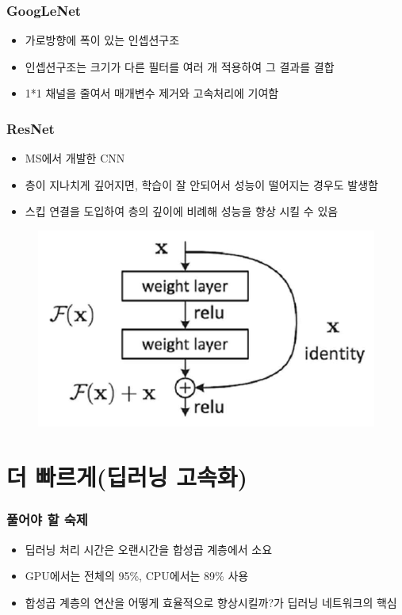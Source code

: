 \documentclass{beamer}
\begin{document}
\begin{frame}
	\frametitle{GoogLeNet}
	\begin{itemize}
		\item 가로방향에 폭이 있는 인셉션구조
		\item 인셉션구조는 크기가 다른 필터를 여러 개 적용하여 그 결과를 결합
		\item 1*1 채널을 줄여서 매개변수 제거와 고속처리에 기여함
	\end{itemize}
	\begin{figure}
	\end{figure}
\end{frame}

\begin{frame}
	\frametitle{ResNet}
	\begin{itemize}
		\item MS에서 개발한 CNN
		\item 층이 지나치게 깊어지면, 학습이 잘 안되어서 성능이 떨어지는 경우도 발생함
		\item 스킵 연결을 도입하여 층의 깊이에 비례해 성능을 향상 시킬 수 있음
	\end{itemize}
	\begin{figure}
		\includegraphics[width=0.5\columnwidth]{Fig_deep/Figure_10.pdf}
	\end{figure}
\end{frame}

\section{더 빠르게(딥러닝 고속화)}
	\begin{frame}
		\frametitle{풀어야 할 숙제}
		\begin{itemize}
			\item 딥러닝 처리 시간은 오랜시간을 합성곱 계층에서 소요
			\item GPU에서는 전체의 95\%, CPU에서는 89\% 사용
			\item 합성곱 계층의 연산을 어떻게 효율적으로 향상시킬까?가 딥러닝 네트워크의 핵심
		\end{itemize}
\end{frame}
\end{document}
